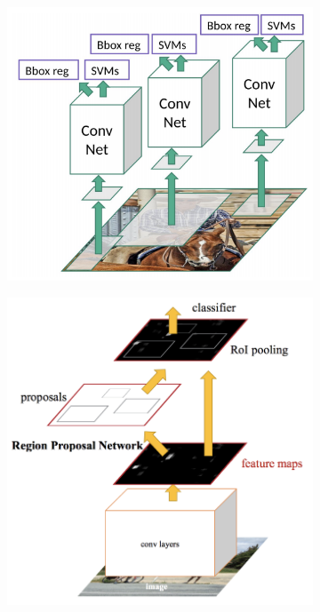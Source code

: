 \begin{figure}
    \centering
    \begin{subfigure}[b]{0.45\textwidth}
         \centering
         \includegraphics[width=\textwidth]{images/rcnn.png}
         \caption{}
         \label{fig:rcnn}
     \end{subfigure}
     \hfill
    \begin{subfigure}[b]{0.45\textwidth}
         \centering
         \includegraphics[width=\textwidth]{images/ffrcnn.png}

\end{subfigure}
\end{figure}
